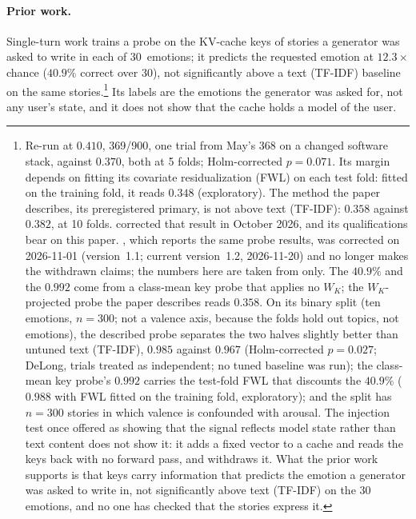 \documentclass[11pt,a4paper]{article}
\begin{document}
\paragraph{Prior work.} Single-turn work
\citep{lyra2026techniqueii,lyra2026usermodel} trains a probe on the
KV-cache keys of stories a generator was asked to write in each of
30~emotions; it predicts the requested emotion at $12.3\times$ chance
($40.9\%$ correct over 30), not significantly above a text (TF-IDF)
baseline on the same stories.\footnote{Re-run at $0.410$, 369/900, one
trial from May's 368 on a changed software stack, against $0.370$, both
at 5 folds; Holm-corrected $p = 0.071$. Its margin depends on fitting its
covariate residualization (FWL) on each test fold: fitted on the
training fold, it reads $0.348$ (exploratory). The method the paper
describes, its preregistered primary, is not above text (TF-IDF):
$0.358$ against $0.382$, at 10 folds. \citet{lyra2026usermodel}
corrected that result in October 2026, and its qualifications bear on
this paper. \citet{lyra2026techniqueii}, which reports the same probe
results, was corrected on 2026-11-01 (version~1.1; current version~1.2,
2026-11-20) and no longer
makes the withdrawn claims;
the numbers here are taken from \citet{lyra2026usermodel} only. The
$40.9\%$ and the $0.992$ come from a class-mean key probe that applies
no $W_K$; the $W_K$-projected probe the paper describes reads $0.358$.
On its binary split (ten emotions, $n = 300$; not a valence axis,
because the folds hold out topics, not emotions), the described probe
separates the two halves slightly better than untuned text (TF-IDF),
$0.985$ against $0.967$ (Holm-corrected $p = 0.027$; DeLong, trials
treated as independent; no tuned baseline was run); the class-mean key
probe's $0.992$ carries the test-fold FWL that discounts the $40.9\%$
($0.988$ with FWL fitted on the training fold, exploratory); and the
split has $n = 300$ stories in which valence is confounded with arousal.
The injection test once offered as showing that the signal reflects
model state rather than text content does not show it: it adds a fixed
vector to a cache and reads the keys back with no forward pass, and
\citet{lyra2026usermodel} withdraws it. What the prior work supports is
that keys carry information that predicts the emotion a generator was
asked to write in, not significantly above text (TF-IDF) on the 30
emotions, and no one has checked that the stories express it.} Its
labels are the emotions the generator was asked for, not any user's
state, and it does not show that the cache holds a model of the user.
\end{document}
